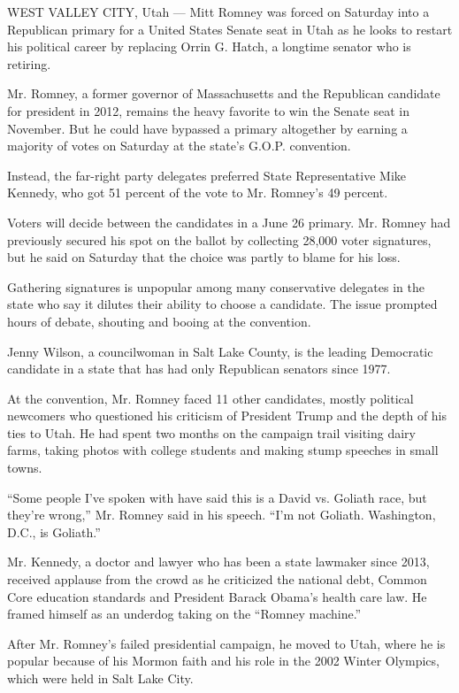 WEST VALLEY CITY, Utah --- Mitt Romney was forced on Saturday into a
Republican primary for a United States Senate seat in Utah as he looks
to restart his political career by replacing Orrin G. Hatch, a longtime
senator who is retiring.

Mr. Romney, a former governor of Massachusetts and the Republican
candidate for president in 2012, remains the heavy favorite to win the
Senate seat in November. But he could have bypassed a primary altogether
by earning a majority of votes on Saturday at the state's G.O.P.
convention.

Instead, the far-right party delegates preferred State Representative
Mike Kennedy, who got 51 percent of the vote to Mr. Romney's 49 percent.

Voters will decide between the candidates in a June 26 primary. Mr.
Romney had previously secured his spot on the ballot by collecting
28,000 voter signatures, but he said on Saturday that the choice was
partly to blame for his loss.

Gathering signatures is unpopular among many conservative delegates in
the state who say it dilutes their ability to choose a candidate. The
issue prompted hours of debate, shouting and booing at the convention.

Jenny Wilson, a councilwoman in Salt Lake County, is the leading
Democratic candidate in a state that has had only Republican senators
since 1977.

At the convention, Mr. Romney faced 11 other candidates, mostly
political newcomers who questioned his criticism of President Trump and
the depth of his ties to Utah. He had spent two months on the campaign
trail visiting dairy farms, taking photos with college students and
making stump speeches in small towns.

``Some people I've spoken with have said this is a David vs. Goliath
race, but they're wrong,'' Mr. Romney said in his speech. ``I'm not
Goliath. Washington, D.C., is Goliath.''

Mr. Kennedy, a doctor and lawyer who has been a state lawmaker since
2013, received applause from the crowd as he criticized the national
debt, Common Core education standards and President Barack Obama's
health care law. He framed himself as an underdog taking on the ``Romney
machine.''

After Mr. Romney's failed presidential campaign, he moved to Utah, where
he is popular because of his Mormon faith and his role in the 2002
Winter Olympics, which were held in Salt Lake City.

